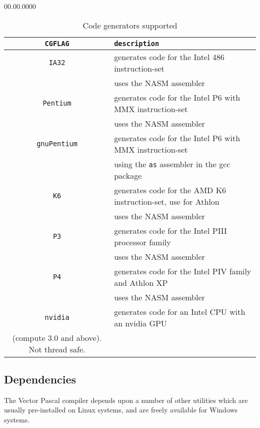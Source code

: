 {\begin{lyxlist}{00.00.0000}
\begin{table}
\caption{Code generators supported\label{cgs}}
{\centering \begin{tabular}{|c|l|}
\hline 
\texttt{CGFLAG}&
\texttt{description}\\
\hline 
\hline 
\texttt{IA\index{IA32}32}&
generates code for the Intel 486 instruction-set\\
&uses the NASM assembler\\
\hline
\texttt{Pentium\index{Pentium}}&
generates code for the Intel P6 with MMX instruction-set\\
& uses the NASM \index{NASM} assembler\\
\hline

\hline
\texttt{gnuPentium\index{Pentium}}&
generates code for the Intel P6 with MMX instruction-set\\
& using the {\tt as} \index{as} assembler in the gcc package\\
\hline
\texttt{K6\index{K6}}&
generates code for the AMD\index{AMD} K6 instruction-set, use for Athlon\\
& uses the NASM assembler\\
\hline
\texttt{P3\index{P3}}&
generates code for the Intel\index{Intel} PIII processor family\texttt{}\\
& uses the NASM assembler\\
\hline
\texttt{P4} &
generates code for the Intel PIV family and Athlon XP\\
& uses the NASM assembler\\
\hline
\texttt{nvidia} &
generates code for an Intel CPU with an nvidia GPU \\
(compute 3.0 and above). Not thread safe.\\
\hline
\end{tabular}\par}\end{table}

\end{lyxlist}

\subsection{Dependencies}

The Vector Pascal compiler depends upon a number of other utilities which are
usually pre-installed on Linux systems, and are freely available for Windows
systems.

}
